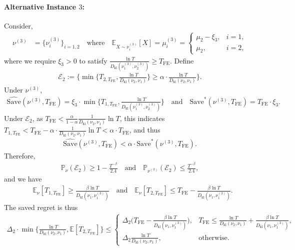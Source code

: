 \documentclass[twoside,11pt]{article}
\newcommand{\kl}{D_{\mathrm{kl}}}
\newcommand{\calE}{\mathcal{E}}
\newcommand{\bbE}{\mathbb{E}}
\newcommand{\bbP}{\mathbb{P}}
\newcommand{\Tfe}{T_{\mathrm{FE}}}
\newcommand{\Saved}{\mathrm{Save}}
\begin{document}
\paragraph{Alternative Instance $3$:} Consider,
\begin{align}
\nu^{(3)} 
&= \big\{ \nu_i^{(3)} \big\}_{i=1,2} 
\quad\text{where}\quad \bbE_{X\sim \nu_i^{(3)}}[X]=
\mu_i^{(3)} =
\begin{cases}
\mu_2 - \xi_3, & i = 1, \\
\mu_2,& i = 2,
\end{cases}
\end{align}
where we require $\xi_3>0$ to satisfy $\frac{\ln T}{\kl(\nu_1^{(3)},\nu_2^{(3)})}\geq \Tfe.$
Define 
\begin{align}
    \calE_2 :=\bigg\{\min\Big\{T_{2,\Tfe},\frac{\ln T}{\kl(\nu_2,\nu_1)}\Big\}\geq \alpha\cdot\frac{\ln T}{\kl(\nu_2,\nu_1)}\bigg\}.
\end{align}
Under $\nu^{(3)}$,
\begin{align}
    \widehat{\Saved}(\nu^{(3)},\Tfe) = \xi_3\cdot  \min\bigg\{ T_{1,\Tfe},\frac{\ln T}{\kl(\nu_1^{(3)},\nu_2^{(3)})}\bigg\}
    \quad
    \mbox{and}
    \quad
    \Saved^*(\nu^{(3)},\Tfe) = \Tfe\cdot\xi_3.
\end{align}
Under $\calE_2$, as $\Tfe< \frac{\alpha}{1-\alpha} \frac{1}{\kl(\nu_2,\nu_1)}\ln T$, this indicates $T_{1,\Tfe}<\Tfe-\alpha\cdot  \frac{1}{\kl(\nu_2,\nu_1)}\ln T<\alpha\cdot \Tfe$, and thus
\begin{align}
     \widehat{\Saved}(\nu^{(3)},\Tfe) <\alpha\cdot \Saved^*(\nu^{(3)},\Tfe).
\end{align}
Therefore,
\begin{align}
    \bbP_{\nu}(\calE_2)\geq 1- \frac{T^{-\beta}}{2.4}
    \quad\mbox{and}\quad
    \bbP_{\nu^{(3)}}(\calE_2)\leq \frac{T^{-\beta}}{2.4},
\end{align}
and we have 
\begin{align}
    &\bbE_{\nu}[T_{1,\Tfe}] \geq \frac{\beta \ln T}{\kl(\nu_1,\nu_1^{(3)})}
    \quad\mbox{and}\quad
    \bbE_{\nu}[T_{2,\Tfe}] \leq \Tfe-\frac{\beta \ln T}{\kl(\nu_1,\nu_1^{(3)})}.
\end{align}
The saved regret is thus
\begin{align}
    \Delta_2\!\cdot\!\min\bigg\{\frac{\ln T}{\kl(\nu_2,\nu_1)},\bbE[T_{2,\Tfe}]\bigg\}
    \!\leq
    \begin{cases}
        \Delta_2\Big(
                \Tfe-\frac{\beta\ln T}{\kl(\nu_1,\nu_1^{(3)})}
            \Big), & \!\!\Tfe\leq \frac{\ln T}{\kl(\nu_2,\nu_1)}+\frac{\beta\ln T}{\kl(\nu_1,\nu_1^{(3)})}, 
        \\
        \Delta_2  \frac{\ln T}{\kl(\nu_2,\nu_1)},& \!\!\mbox{otherwise}.
    \end{cases}
\end{align}
\end{document}
